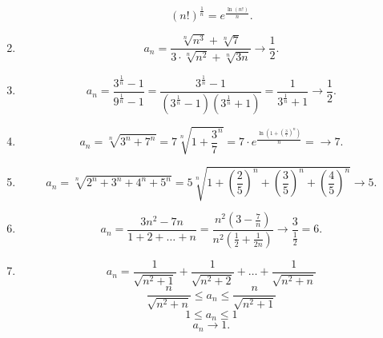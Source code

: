 \begin{enumerate}
    \begin{equation*}
        (n!)^{\frac{1}{n}} = e^{\frac{\ln(n!)}{n}}
    .\end{equation*}

\item
    \begin{equation*}
        a_n = \frac{\sqrt[n]{n^3} + \sqrt[n]{7}}{3 \cdot \sqrt[n]{n^2} + \sqrt[n]{3n}} \to \frac{1}{2}
    .\end{equation*}

\item
    \begin{equation*}
        a_n = \frac{3^{\frac{1}{n}} - 1}{9^{\frac{1}{n}} - 1} = \frac{3^{\frac{1}{n}} - 1}{(3^{\frac{1}{n}} - 1)(3^{\frac{1}{n}} + 1)} = \frac{1}{3^{\frac{1}{n}} + 1} \to \frac{1}{2}
    .\end{equation*}

\item
    \begin{equation*}
        a_n = \sqrt[n]{3^n + 7^n} = 7 \sqrt[n]{1 + \frac{3}{7}^n} = 7 \cdot e^{\frac{\ln(1 + (\frac{3}{7})^n)}{n}} = \to 7
    .\end{equation*}

\item
    \begin{equation*}
        a_n = \sqrt[n]{2^n + 3^n + 4^n + 5^n} = 5\sqrt[n]{1 + \left(\frac{2}{5}\right)^n + \left(\frac{3}{5}\right)^n + \left(\frac{4}{5}\right)^n} \to 5
    .\end{equation*}

\item
    \begin{equation*}
        a_n = \frac{3n^2 - 7n}{1 + 2 + \dots + n} = \frac{n^2(3 - \frac{7}{n})}{n^2(\frac{1}{2} + \frac{1}{2n})} \to \frac{3}{\frac{1}{2}} = 6
    .\end{equation*}

\item
    \begin{equation*}
        a_n = \frac{1}{\sqrt{n^2 + 1}} + \frac{1}{\sqrt{n^2 + 2}} + \dots + \frac{1}{\sqrt{n^2 + n}}
    \end{equation*}
    \begin{equation*}
        \frac{n}{\sqrt{n^2 + n}} \leq a_n \leq \frac{n}{\sqrt{n^2 + 1}}
    \end{equation*}
    \begin{equation*}
        1 \leq a_n \leq 1
    \end{equation*}
    \begin{equation*}
        a_n \to 1
    .\end{equation*}


\end{enumerate}
